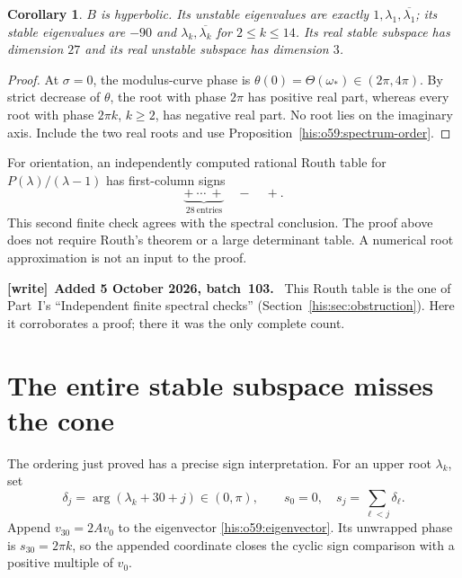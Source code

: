\documentclass[11pt]{article}
\newtheorem{corollary}[theorem]{Corollary}
\theoremstyle{remark}\newtheorem{remark}[theorem]{Remark}
\numberwithin{equation}{section}
\newenvironment{writenote}[1][]{\par\smallskip\begingroup\small
 \noindent\textbf{[write]}\if\relax\detokenize{#1}\relax\else~\textbf{#1.}\fi\ }%
 {\par\endgroup\smallskip}
\begin{document}
\begin{corollary}\label{his:o59:spectral-count}
$B$ is hyperbolic. Its unstable eigenvalues are exactly
$1,\lambda_1,\overline{\lambda_1}$; its stable eigenvalues are
$-90$ and $\lambda_k,\overline{\lambda_k}$ for $2\le k\le14$.
Its real stable subspace has dimension $27$ and its real unstable
subspace has dimension $3$.
\end{corollary}
\begin{proof}
At $\sigma=0$, the modulus-curve phase is
$\theta(0)=\Theta(\omega_*)\in(2\pi,4\pi)$.
By strict decrease of $\theta$, the root with phase $2\pi$ has
positive real part, whereas every root with phase $2\pi k$, $k\ge2$,
has negative real part. No root lies on the imaginary axis. Include
the two real roots and use Proposition~\ref{his:o59:spectrum-order}.
\end{proof}

For orientation, an independently computed rational Routh table for
$P(\lambda)/(\lambda-1)$ has first-column signs
\[
\underbrace{+\ \cdots\ +}_{28\ \text{entries}}\quad-\quad+.
\]
This second finite check agrees with the spectral conclusion. The
proof above does not require Routh's theorem or a large determinant
table. A numerical root approximation is not an input to the proof.
\begin{writenote}[Added 5 October 2026, batch~103]
This Routh table is the one of Part~I's ``Independent finite spectral checks'' (Section~\ref{his:sec:obstruction}). Here it corroborates a proof; there it was the only complete count.
\end{writenote}


\section{The entire stable subspace misses the cone}
The ordering just proved has a precise sign interpretation.
For an upper root $\lambda_k$, set
\[
\delta_j=\arg(\lambda_k+30+j)\in(0,\pi),\qquad
s_0=0,\quad s_j=\sum_{\ell<j}\delta_\ell.
\]
Append $v_{30}=2Av_0$ to the eigenvector \eqref{his:o59:eigenvector}. Its
unwrapped phase is $s_{30}=2\pi k$, so the appended coordinate
closes the cyclic sign comparison with a positive multiple of $v_0$.
\end{document}
